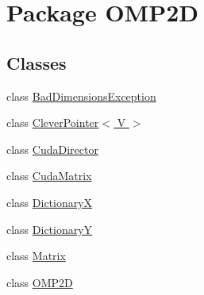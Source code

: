 \hypertarget{namespaceOMP2D}{\section{Package O\-M\-P2\-D}
\label{namespaceOMP2D}
}
\subsection*{Classes}
\begin{DoxyCompactItemize}
\item 
class \hyperlink{classOMP2D_1_1BadDimensionsException}{Bad\-Dimensions\-Exception}
\item 
class \hyperlink{classOMP2D_1_1CleverPointer_3_01V_01_4}{Clever\-Pointer$<$ V $>$}
\item 
class \hyperlink{classOMP2D_1_1CudaDirector}{Cuda\-Director}
\item 
class \hyperlink{classOMP2D_1_1CudaMatrix}{Cuda\-Matrix}
\item 
class \hyperlink{classOMP2D_1_1DictionaryX}{Dictionary\-X}
\item 
class \hyperlink{classOMP2D_1_1DictionaryY}{Dictionary\-Y}
\item 
class \hyperlink{classOMP2D_1_1Matrix}{Matrix}
\item 
class \hyperlink{classOMP2D_1_1OMP2D}{O\-M\-P2\-D}
\end{DoxyCompactItemize}
